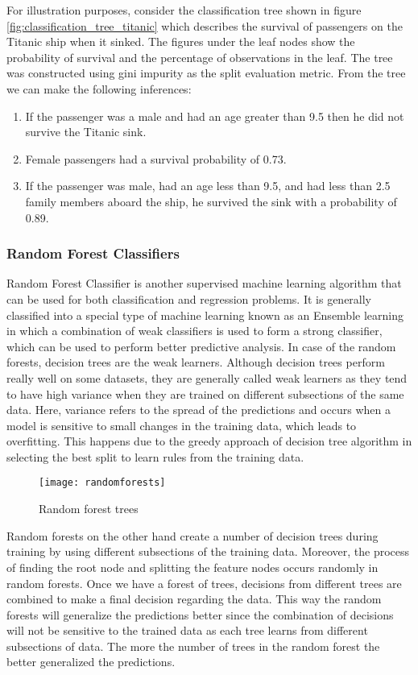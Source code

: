 \documentclass[11pt,openright]{report}
\begin{document}
For illustration purposes, consider the classification tree shown in figure \ref{fig:classification_tree_titanic}  which describes the survival of passengers on the Titanic ship when it sinked. The figures under the leaf nodes show the probability of survival and the percentage of observations in the leaf. The tree was constructed using gini impurity as the split evaluation metric. From the tree we can make the following inferences: 
\begin{enumerate}
  \item If the passenger was a male and had an age greater than 9.5 then he did not survive the Titanic sink.
  \item Female passengers had a survival probability of 0.73.
  \item If the passenger was male, had an age less than 9.5, and had less than 2.5 family members aboard the ship, he survived the sink with a probability of 0.89.
\end{enumerate}


\subsubsection {Random Forest Classifiers}  \label{sssec:rf}
Random Forest Classifier is another supervised machine learning algorithm that can be used for both classification and regression problems. It is generally classified into a special type of machine learning known as an Ensemble learning in which a combination of weak classifiers is used to form a strong classifier, which can be used to perform better predictive analysis. In case of the random forests, decision trees are the weak learners.  Although decision trees perform really well on some datasets, they are generally called weak learners as they tend to have high variance when they are trained on different subsections of the same data. Here, variance refers to the spread of the predictions and occurs when a model is sensitive to small changes in the training data, which leads to overfitting. This happens due to the greedy approach of decision tree algorithm in selecting the best split to learn rules from the training data.
  \begin{figure}
	\centering
	\texttt{[image: randomforests]}
	\caption{Random forest trees}
	\label{fig:random_forest_trees}
\end{figure} 


Random forests on the other hand create a number of decision trees during training by using different subsections of the training data. Moreover, the process of finding the root node and splitting the feature nodes occurs randomly in random forests. Once we have a forest of trees, decisions from different trees are combined to make a final decision regarding the data. This way the random forests will generalize the predictions better since the combination of decisions will not be sensitive to the trained data as each tree learns from different subsections of data. The more the number of trees in the random forest the better generalized the predictions.
\end{document}
